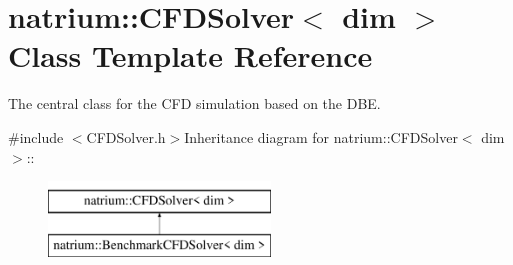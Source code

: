 \hypertarget{classnatrium_1_1CFDSolver}{
\section{natrium::CFDSolver$<$ dim $>$ Class Template Reference}
\label{classnatrium_1_1CFDSolver}
}


The central class for the CFD simulation based on the DBE.  


{\ttfamily \#include $<$CFDSolver.h$>$}Inheritance diagram for natrium::CFDSolver$<$ dim $>$::\begin{figure}[H]
\begin{center}
\leavevmode
\includegraphics[height=2cm]{classnatrium_1_1CFDSolver}
\end{center}
\end{figure}
